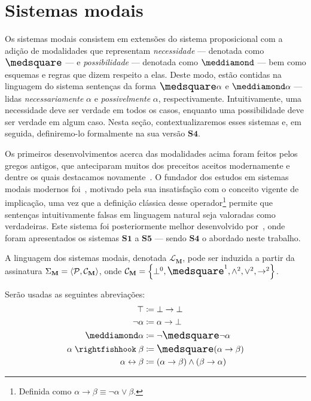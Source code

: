 \section{Sistemas modais}
    Os sistemas modais consistem em extensões do sistema proposicional com a adição de modalidades que representam \emph{necessidade} --- denotada como $\nec$ --- e \emph{possibilidade} --- denotada como $\pos$ --- bem como esquemas e regras que dizem respeito a elas. Deste modo, estão contidas na linguagem do sistema sentenças da forma $\nec\alpha$ e $\pos\alpha$ --- lidas \emph{necessariamente} $\alpha$ e \emph{possivelmente} $\alpha$, respectivamente. Intuitivamente, uma necessidade deve ser verdade em todos os casos, enquanto uma possibilidade deve ser verdade em algum caso. Nesta seção, contextualizaremos esses sistemas e, em seguida, definiremo-lo formalmente na sua versão $\mathbf{S4}$.

    Os primeiros desenvolvimentos acerca das modalidades acima foram feitos pelos gregos antigos, que anteciparam muitos dos preceitos aceitos modernamente e dentre os quais destacamos novamente~\cite{Aristotle}. O fundador dos estudos em sistemas modais modernos foi~\cite{Lewis}, motivado pela sua insatisfação com o conceito vigente de implicação, uma vez que a definição clássica desse operador\footnote{Definida como $\alpha\to\beta\equiv\neg\alpha\vee\beta$.} permite que sentenças intuitivamente falsas em linguagem natural seja valoradas como verdadeiras. Este sistema foi posteriormente melhor desenvolvido por~\cite{Langford}, onde foram apresentados os sistemas $\mathbf{S1}$ a $\mathbf{S5}$ --- sendo $\mathbf{S4}$ o abordado neste trabalho.

    \begin{definition}
        A linguagem dos sistemas modais, denotada $\mathcal{L}_\mathbf{M}$, pode ser induzida a partir da assinatura $\Sigma_\mathbf{M}=\langle\mathcal{P},\mathcal{C}_\mathbf{M}\rangle$, onde $\mathcal{C}_\mathbf{M}=\set{\bot^0,\nec^1,\wedge^2,\vee^2,\to^2}$.
    \end{definition}

    \begin{notation}
        Serão usadas as seguintes abreviações:
        \begin{align*}
            \top&\coloneqq\bot\to\bot\\
            \neg\alpha&\coloneqq\alpha\to\bot\\
            \pos\alpha&\coloneqq\neg\nec\neg\alpha\\
            \alpha\strictif\beta&\coloneqq\nec(\alpha\to\beta)\\
            \alpha\leftrightarrow\beta&\coloneqq(\alpha\to\beta)\wedge(\beta\to\alpha)
        \end{align*}
    \end{notation}

